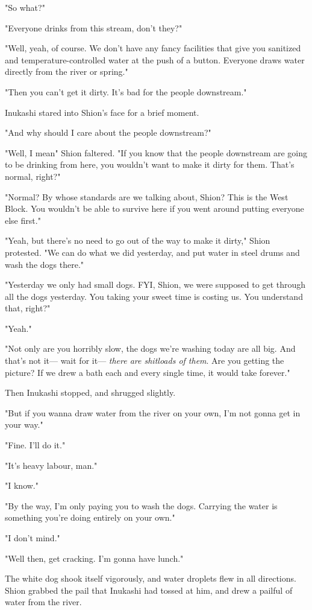 "So what?"

"Everyone drinks from this stream, don't they?"

"Well, yeah, of course. We don't have any fancy facilities that give you
sanitized and temperature-controlled water at the push of a button.
Everyone draws water directly from the river or spring."

"Then you can't get it dirty. It's bad for the people downstream."

Inukashi stared into Shion's face for a brief moment.

"And why should I care about the people downstream?"

"Well, I mean\el " Shion faltered. "If you know that the people
downstream are going to be drinking from here, you wouldn't want to make
it dirty for them. That's normal, right?"

"Normal? By whose standards are we talking about, Shion? This is the
West Block. You wouldn't be able to survive here if you went around
putting everyone else first."

"Yeah, but there's no need to go out of the way to make it dirty," Shion
protested. "We can do what we did yesterday, and put water in steel
drums and wash the dogs there."

"Yesterday we only had small dogs. FYI, Shion, we were supposed to get
through all the dogs yesterday. You taking your sweet time is costing
us. You understand that, right?"

"Yeah."

"Not only are you horribly slow, the dogs we're washing today are all
big. And that's not it--- wait for it--- \emph{there are shitloads of them}. Are
you getting the picture? If we drew a bath each and every single time,
it would take forever."

Then Inukashi stopped, and shrugged slightly.

"But if you wanna draw water from the river on your own, I'm not gonna
get in your way."

"Fine. I'll do it."

"It's heavy labour, man."

"I know."

"By the way, I'm only paying you to wash the dogs. Carrying the water is
something you're doing entirely on your own."

"I don't mind."

"Well then, get cracking. I'm gonna have lunch."

The white dog shook itself vigorously, and water droplets flew in all
directions. Shion grabbed the pail that Inukashi had tossed at him, and
drew a pailful of water from the river.

